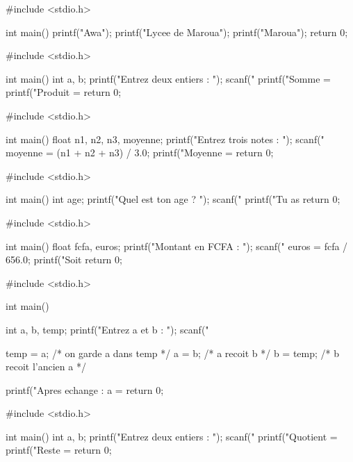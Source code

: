 \begin{codec}
#include <stdio.h>

int main()
{
    printf("Awa\n");
    printf("Lycee de Maroua\n");
    printf("Maroua\n");
    return 0;
}
\end{codec}

\begin{codec}
#include <stdio.h>

int main()
{
    int a, b;
    printf("Entrez deux entiers : ");
    scanf("%
    printf("Somme = %
    printf("Produit = %
    return 0;
}
\end{codec}

\begin{codec}
#include <stdio.h>

int main()
{
    float n1, n2, n3, moyenne;
    printf("Entrez trois notes : ");
    scanf("%
    moyenne = (n1 + n2 + n3) / 3.0;
    printf("Moyenne = %
    return 0;
}
\end{codec}

\begin{codec}
#include <stdio.h>

int main()
{
    int age;
    printf("Quel est ton age ? ");
    scanf("%
    printf("Tu as %
    return 0;
}
\end{codec}

\begin{codec}
#include <stdio.h>

int main()
{
    float fcfa, euros;
    printf("Montant en FCFA : ");
    scanf("%
    euros = fcfa / 656.0;
    printf("Soit %
    return 0;
}
\end{codec}

\begin{codec}
#include <stdio.h>

int main()
{
    int a, b, temp;
    printf("Entrez a et b : ");
    scanf("%

    temp = a;    /* on garde a dans temp */
    a = b;       /* a recoit b */
    b = temp;    /* b recoit l'ancien a */

    printf("Apres echange : a = %
    return 0;
}
\end{codec}

\begin{codec}
#include <stdio.h>

int main()
{
    int a, b;
    printf("Entrez deux entiers : ");
    scanf("%
    printf("Quotient = %
    printf("Reste = %
    return 0;
}
\end{codec}

